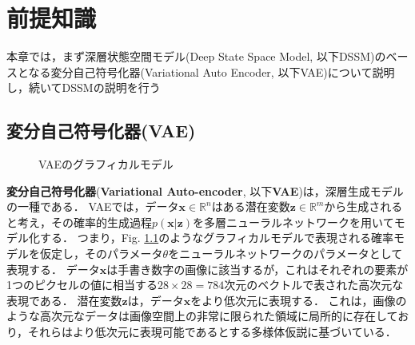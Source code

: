 \chapter{前提知識}
\label{chap:prerequisite}
本章では，まず深層状態空間モデル(Deep State Space Model, 以下DSSM)のベースとなる変分自己符号化器(Variational Auto Encoder, 以下VAE)について説明し，続いてDSSMの説明を行う

\section{変分自己符号化器(VAE)}
\label{section:VAE}

\begin{figure}[tbp]
\begin{center}
\caption{VAEのグラフィカルモデル}
\label{fig:gm_vae}
\end{center}
\end{figure}

{\bf 変分自己符号化器}({\bf Variational Auto-encoder}, 以下{\bf VAE})\cite{vae}は，深層生成モデルの一種である．
VAEでは，データ$\bm{x} \in \mathbb{R}^n$はある潜在変数$\bm{z} \in \mathbb{R}^m$から生成されると考え，その確率的生成過程$p(\bm{x}|\bm{z})$を多層ニューラルネットワークを用いてモデル化する．
つまり，Fig. \ref{fig:gm_vae}のようなグラフィカルモデルで表現される確率モデルを仮定し，そのパラメータ$\theta$をニューラルネットワークのパラメータとして表現する．
データ$\bm{x}$は手書き数字の画像に該当するが，これはそれぞれの要素が1つのピクセルの値に相当する$28\times28=784$次元のベクトルで表された高次元な表現である．
潜在変数$\bm{z}$は，データ$\bm{x}$をより低次元に表現する．
これは，画像のような高次元なデータは画像空間上の非常に限られた領域に局所的に存在しており，それらはより低次元に表現可能であるとする多様体仮説に基づいている．

